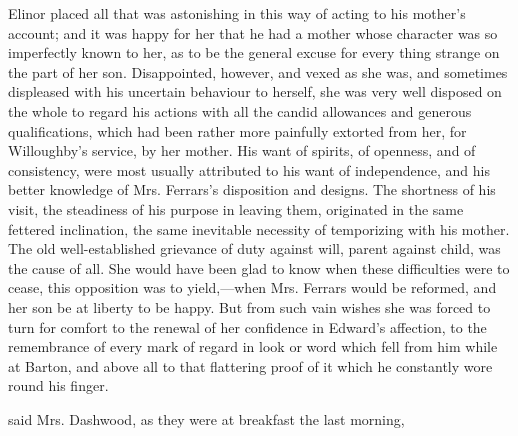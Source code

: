 Elinor placed all that was astonishing in this way of acting to his mother's account; and it was happy for her that he had a mother whose character was so imperfectly known to her, as to be the general excuse for every thing strange on the part of her son. Disappointed, however, and vexed as she was, and sometimes displeased with his uncertain behaviour to herself, she was very well disposed on the whole to regard his actions with all the candid allowances and generous qualifications, which had been rather more painfully extorted from her, for Willoughby's service, by her mother. His want of spirits, of openness, and of consistency, were most usually attributed to his want of independence, and his better knowledge of Mrs. Ferrars's disposition and designs. The shortness of his visit, the steadiness of his purpose in leaving them, originated in the same fettered inclination, the same inevitable necessity of temporizing with his mother. The old well-established grievance of duty against will, parent against child, was the cause of all. She would have been glad to know when these difficulties were to cease, this opposition was to yield,---when Mrs. Ferrars would be reformed, and her son be at liberty to be happy. But from such vain wishes she was forced to turn for comfort to the renewal of her confidence in Edward's affection, to the remembrance of every mark of regard in look or word which fell from him while at Barton, and above all to that flattering proof of it which he constantly wore round his finger.

 said Mrs. Dashwood, as they were at breakfast the last morning, 

